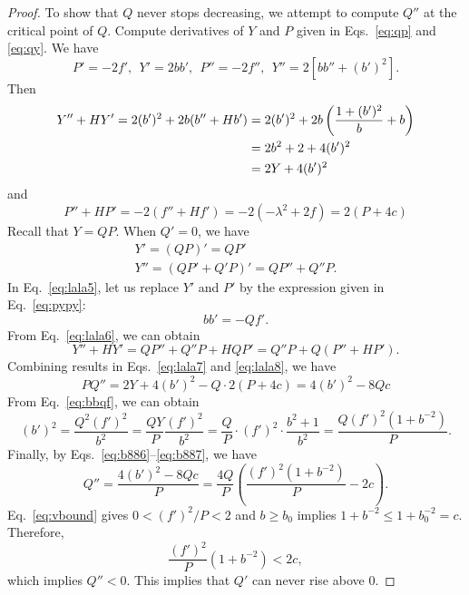 \documentclass[11pt,letterpaper]{article}
\begin{document}
\begin{proof}
    \newpar

    To show that $Q$ never stops decreasing, we attempt to compute $Q''$ at the critical point of $Q$. Compute derivatives of $Y$ and $P$ given in Eqs.~\eqref{eq:qp} and \eqref{eq:qy}. We have
    \begin{equation} \label{eq:pypy}
        P' = -2f',\ \ Y' = 2bb',\ \ P'' = -2f'',\ \ Y'' = 2[bb'' + (b')^2].
    \end{equation}
    Then
    \begin{align}
        Y'' + HY' = 2(b')^2 + 2b(b'' + Hb') &= 2(b')^2 + 2b \left( \frac{1 + (b')^2}{b} + b \right) \notag \\
        &= 2b^2 + 2 + 4(b')^2 \notag \\
        &= 2Y + 4(b')^2 \label{eq:lala7}
    \end{align}
    and
    \begin{equation}
        P'' + HP' = -2(f'' + Hf') = -2(-\lambda^2 + 2f) = 2(P + 4c)
    \end{equation}
    Recall that $Y = QP$. When $Q' = 0$, we have
    \begin{gather}
        Y' = (QP)' = QP' \label{eq:lala5} \\
        Y'' = (QP' + Q'P)' = QP'' + Q''P. \label{eq:lala6}
    \end{gather}
    In Eq.~\eqref{eq:lala5}, let us replace $Y'$ and $P'$ by the expression given in Eq.~\eqref{eq:pypy}:
    \begin{equation}
        bb' = -Qf'. \label{eq:bbqf}
    \end{equation}
    From Eq.~\eqref{eq:lala6}, we can obtain
    \begin{equation} \label{eq:lala8}
        Y'' + HY' = QP'' + Q''P + HQP' = Q''P + Q(P'' + HP').
    \end{equation}
    Combining results in Eqs.~\eqref{eq:lala7} and \eqref{eq:lala8}, we have
    \begin{equation}
        PQ'' = 2Y + 4(b')^2 - Q \cdot 2(P + 4c) = 4(b')^2 - 8Qc \label{eq:b886}
    \end{equation}
    From Eq.~\eqref{eq:bbqf}, we can obtain
    \begin{equation}
        (b')^2 = \frac{Q^2(f')^2}{b^2} = \frac{QY}{P} \frac{(f')^2}{b^2} = \frac QP \cdot (f')^2 \cdot \frac{b^2 + 1}{b^2}
        = \frac{Q(f')^2 (1 + b^{-2})}{P}. \label{eq:b887}
    \end{equation}
    Finally, by Eqs.~\eqref{eq:b886}--\eqref{eq:b887}, we have
    \begin{equation}
        Q'' = \frac{4(b')^2 - 8Qc}{P} = \frac{4Q}P \left( \frac{(f')^2 (1 + b^{-2})}{P} - 2c \right).
    \end{equation}
    Eq.~\eqref{eq:vbound} gives $0 < (f')^2/P < 2$ and $b \ge b_0$ implies $1 + b^{-2} \le 1 + b_0^{-2} = c$. Therefore,
    \begin{equation}
        \frac{(f')^2}{P} (1 + b^{-2}) < 2c,
    \end{equation}
    which implies $Q'' < 0$. This implies that $Q'$ can never rise above $0$.


\end{proof}
\end{document}
